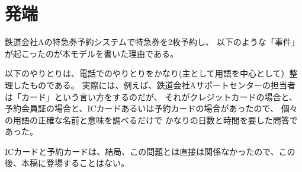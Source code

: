 \section {発端}
鉄道会社Aの特急券予約システムで特急券を2枚予約し、
以下のような「事件」が起こったのが本モデルを書いた理由である。


以下のやりとりは、電話でのやりとりをかなり(主として用語を中心として）整理したものである。
実際には、例えば、鉄道会社Aサポートセンターの担当者は「カード」という言い方をするのだが、
それがクレジットカードの場合と、予約会員証の場合と、ICカードあるいは予約カードの場合があったので、
個々の用語の正確な名前と意味を調べるだけで
かなりの日数と時間を要した問答であった。

ICカードと予約カードは、結局、この問題とは直接は関係なかったので、この後、本稿に登場することはない。

